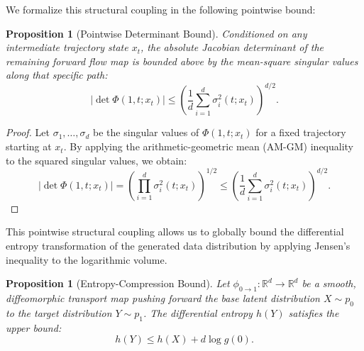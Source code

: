 \documentclass[11pt]{article}
\newtheorem{proposition}[theorem]{Proposition}
\begin{document}
We formalize this structural coupling in the following pointwise bound:

\begin{proposition}[Pointwise Determinant Bound]
\label{prop:detbound}
Conditioned on any intermediate trajectory state $x_t$, the absolute Jacobian determinant of the remaining forward flow map is bounded above by the mean-square singular values along that specific path:
\begin{equation}
|\det \Phi(1,t; x_t)| \le \left(\frac{1}{d} \sum_{i=1}^d \sigma_i^2(t; x_t)\right)^{d/2}.
\end{equation}
\end{proposition}

\begin{proof}
Let $\sigma_1, \dots, \sigma_d$ be the singular values of $\Phi(1,t; x_t)$ for a fixed trajectory starting at $x_t$. By applying the arithmetic-geometric mean (AM-GM) inequality to the squared singular values, we obtain:
\[
|\det \Phi(1,t; x_t)| = \left(\prod_{i=1}^d \sigma_i^2(t; x_t)\right)^{1/2}
\le \left(\frac{1}{d} \sum_{i=1}^d \sigma_i^2(t; x_t)\right)^{d/2}.
\]
\end{proof}

This pointwise structural coupling allows us to globally bound the differential entropy transformation of the generated data distribution by applying Jensen's inequality to the logarithmic volume.

\begin{proposition}[Entropy-Compression Bound]
\label{prop:entropy_bound}
Let $\phi_{0\to 1}: \mathbb{R}^d \to \mathbb{R}^d$ be a smooth, diffeomorphic transport map pushing forward the base latent distribution $X \sim p_0$ to the target distribution $Y \sim p_1$. The differential entropy $h(Y)$ satisfies the upper bound:
\begin{equation}
h(Y) \le h(X) + d \log g(0).
\end{equation}
\end{proposition}
\end{document}
